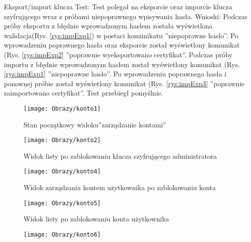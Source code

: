 \begin{enumerate*}
	\item Eksport/import klucza\newline
	Test: Test polegał na eksporcie oraz imporcie klucza szyfrującego wraz z próbami niepoprawnego wpisywania hasła.\newline
	Wnioski: Podczas próby eksportu z błędnie wprowadzonym hasłem została wyświetlona walidacja(Rys. \ref{rys:impExp1}) w postaci komunikatu ''niepoprawne hasło''. Po wprowadzeniu poprawnego hasła oraz eksporcie został wyświetlony komunikat (Rys. \ref{rys:impExp2} ''poprawnie wyeksportowano certyfikat''. Podczas próby importu z błędnie wprowadzonym hasłem został wyświetlony komunikat (Rys. \ref{rys:impExp1} ''niepoprawne hasło''. Po wprowadzeniu poprawnego hasła i ponownej próbie został wyświetlony komunikat (Rys. \ref{rys:impExp3} ''poprawnie zaimportowano certyfikat''. Test przebiegł pomyślnie.
		\begin{figure}[ht!]
					\centering
					\begin{minipage}{0.23\textwidth}
						\texttt{[image: Obrazy/konto1]}
						\caption{Stan początkowy widoku''zarządzanie kontami'' }
						\label{rys:zarzadzanieKontem1}
					\end{minipage}
					\hspace{0.01\textwidth}
				\begin{minipage}{0.23\textwidth}
					\texttt{[image: Obrazy/konto2]}
					\caption{Widok listy po zablokowaniu klucza szyfrującego administratora }
					\label{rys:zarzadzanieKontem2}
				\end{minipage}
				\hspace{0.01\textwidth}
			\begin{minipage}{0.23\textwidth}
				\texttt{[image: Obrazy/konto4]}
				\caption{Widok zarządzania kontem użytkownika po zablokowaniu konta }
				\label{rys:zarzadzanieKontem4}
			\end{minipage}
			\hspace{0.01\textwidth}
			\begin{minipage}{0.23\textwidth}
				\texttt{[image: Obrazy/konto5]}
				\caption{Widok listy po zablokowaniu konta użytkownika}
				\label{rys:zarzadzanieKontem5}
			\end{minipage}
\end{figure}
\newpage
\begin{figure}[ht!]
	\centering
		\begin{minipage}{0.3\textwidth}
			\texttt{[image: Obrazy/konto6]}

\end{minipage}
\end{figure}
\end{enumerate*}
